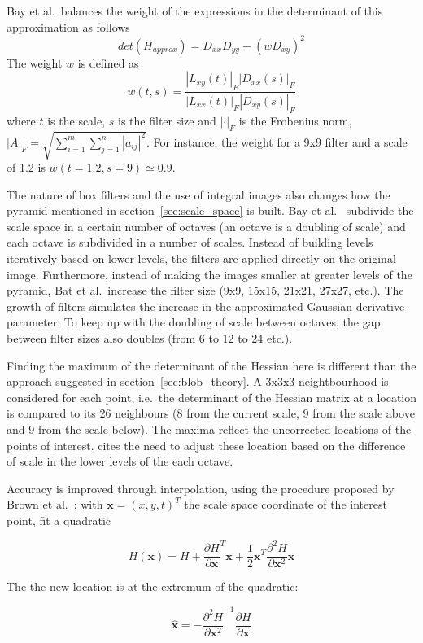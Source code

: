 Bay et al.\ balances the weight of the expressions in the determinant of this approximation as follows
\begin{equation}
    det(H_{approx}) = D_{xx} D_{yy} - (w D_{xy})^2
\end{equation}
The weight $w$ is defined as 
\begin{equation}
w(t,s) = \frac{\left|L_{xy}(t)\right|_F \left|D_{xx}(s)\right|_F}{\left|L_{xx}(t)\right|_F \left|D_{xy}(s)\right|_F}
\end{equation}
where $t$ is the scale, $s$ is the filter size and $\left|\cdot\right|_F$ is the Frobenius norm, $\left|A\right|_F=\sqrt{\sum_{i=1}^m\sum_{j=1}^n |a_{ij}|^2}$.
For instance, the weight for a 9x9 filter and a scale of 1.2 is $w(t=1.2, s=9) \simeq 0.9$.

The nature of box filters and the use of integral images also changes how the pyramid mentioned in section~\ref{sec:scale_space} is built.
Bay et al.\ \cite{Bay06surf} subdivide the scale space in a certain number of octaves (an octave is a doubling of scale) and each octave is subdivided in a number of scales. Instead of building levels iteratively based on lower levels, the filters are applied directly on the original image. Furthermore, instead of making the images smaller at greater levels of the pyramid, Bat et al.\ increase the filter size (9x9, 15x15, 21x21, 27x27, etc.). The growth of filters simulates the increase in the approximated Gaussian derivative parameter. To keep up with the doubling of scale between octaves, the gap between filter sizes also doubles (from 6 to 12 to 24 etc.).

Finding the maximum of the determinant of the Hessian here is different than the approach suggested in section~\ref{sec:blob_theory}. A 3x3x3 neightbourhood is considered for each point, i.e.\ the determinant of the Hessian matrix at a location is compared to its 26 neighbours (8 from the current scale, 9 from the scale above and 9 from the scale below). The maxima reflect the uncorrected locations of the points of interest. \cite{Bay06surf} cites the need to adjust these location based on the difference of scale in the lower levels of the each octave.

Accuracy is improved through interpolation, using the procedure proposed by Brown et al.\ \cite{Brown02invariantfeatures}: with $\mathbf{x} = (x,y,t)^T$ the scale space coordinate of the interest point, fit a quadratic

\begin{equation}
    H(\mathbf{x}) = H + \frac{\partial H}{\partial \mathbf{x}}^T \mathbf{x} + \frac{1}{2} \mathbf{x}^T \frac{\partial^2 H}{\partial \mathbf{x}^2} \mathbf{x}
\end{equation}

The the new location is at the extremum of the quadratic:

\begin{equation}
    \mathbf{\hat{x}} = - \frac{\partial^2 H}{\partial \mathbf{x}^2}^{-1} \frac{\partial H}{\partial \mathbf{x}}
\end{equation}



